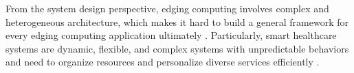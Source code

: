 \documentclass[letterpaper]{article} %
\begin{document}
From the system design perspective, edging computing involves complex and heterogeneous architecture, which makes it hard to build a general framework for every edging computing application ultimately \cite{krishnasamy2020edge}. Particularly, smart healthcare systems are dynamic, flexible, and complex systems with unpredictable behaviors and need to organize resources and personalize diverse services efficiently \cite{oueida2018edge}.






\end{document}
